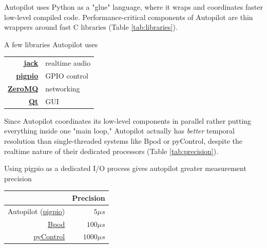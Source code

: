 \documentclass[nohyper, justified, notitlepage, marginals=raggedright,twoside=false,debug]{tufte-autopilot}
\begin{document}
Autopilot uses Python as a "glue" language, where it wraps and coordinates faster low-level compiled code\citep{vanrossumGlueItAll1998}.  
Performance-critical components of Autopilot are thin wrappers around fast C libraries (Table \ref{tab:libraries}).

\begin{margintable}[0.1cm]
\caption{A few libraries Autopilot uses}
\label{tab:libraries}
\noindent\begin{tabularx}{\linewidth}{Rl}
\toprule
 \textbf{\href{http://jackaudio.org/}{jack}} & realtime audio \\
 \textbf{\href{http://abyz.me.uk/rpi/pigpio/index.html}{pigpio}} & GPIO control \\
 \textbf{\href{http://zeromq.org/}{ZeroMQ}} & networking \\
 \textbf{\href{https://www.qt.io/}{Qt}} & GUI \\
 \bottomrule
\end{tabularx}

\end{margintable}

Since Autopilot coordinates its low-level components in parallel rather putting everything inside one "main loop," Autopilot actually has \textit{better} temporal resolution than  single-threaded systems like Bpod or pyControl, despite the realtime nature of their dedicated processors (Table \ref{tab:precision}).

\begin{margintable}
\caption{Using pigpio as a dedicated I/O process gives autopilot greater measurement precision}
\label{tab:precision}
\noindent\begin{tabularx}{\linewidth}{rR}\toprule
& Precision \\
\midrule
Autopilot (\href{http://abyz.me.uk/rpi/pigpio/pigpiod.html}{pigpio}) & $5\mu s$ \\
\href{https://github.com/sanworks/Bpod_StateMachine_Firmware/blob/059d1e9195f5bb7d0d5cd7b33f56342eb5a3a55c/Dev/StateMachineFirmware/StateMachineFirmware.ino\#L196}{Bpod} & $100\mu s$ \\
\href{https://bitbucket.org/takam/pycontrol/src/c678552ac57be2108a5461e0c5f8051ce7d3816a/pyControl/framework.py?at=default\&fileviewer=file-view-default\#framework.py-278}{pyControl} & $1000\mu s$ \\
\bottomrule
\end{tabularx}

\end{margintable}
\end{document}
